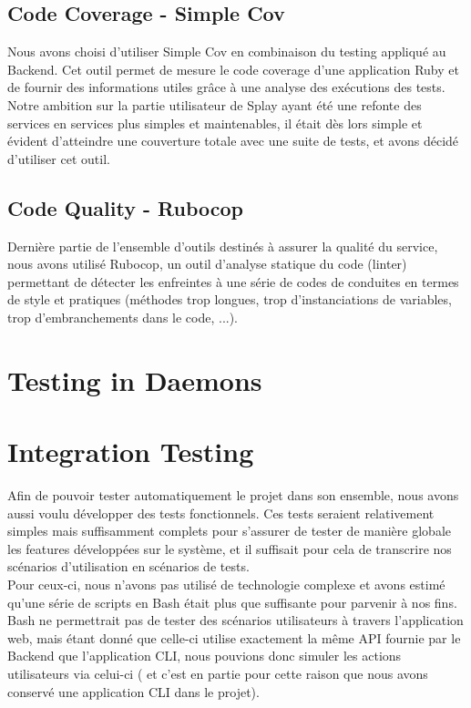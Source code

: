 \documentclass{eplmastersthesis}
\begin{document}
      \subsection{Code Coverage - Simple Cov}

        Nous avons choisi d'utiliser Simple Cov en combinaison du testing appliqué
        au Backend. Cet outil permet de mesure le code coverage d'une application
        Ruby et de fournir des informations utiles grâce à une analyse des
        exécutions des tests.\\

        Notre ambition sur la partie utilisateur de Splay ayant été une refonte
        des services en services plus simples et maintenables, il était dès lors
        simple et évident d'atteindre une couverture totale avec une suite de tests,
        et avons décidé d'utiliser cet outil.

      \subsection{Code Quality - Rubocop}

        Dernière partie de l'ensemble d'outils destinés à assurer la qualité du
        service, nous avons utilisé Rubocop, un outil d'analyse statique du code
        (linter) permettant de détecter les enfreintes à une série de codes
        de conduites en termes de style et pratiques (méthodes trop longues,
        trop d'instanciations de variables, trop d'embranchements dans le code,
        ...).

    \section{Testing in Daemons}


    \section{Integration Testing}

      Afin de pouvoir tester automatiquement le projet dans son ensemble, nous
      avons aussi voulu développer des tests fonctionnels. Ces tests seraient
      relativement simples mais suffisamment complets pour s'assurer de
      tester de manière globale les features développées sur le système, et
      il suffisait pour cela de transcrire nos scénarios d'utilisation en
      scénarios de tests.\\

      Pour ceux-ci, nous n'avons pas utilisé de technologie complexe et avons
      estimé qu'une série de scripts en Bash était plus que suffisante pour
      parvenir à nos fins. Bash ne permettrait pas de tester des scénarios
      utilisateurs à travers l'application web, mais étant donné que celle-ci
      utilise exactement la même API fournie par le Backend que l'application
      CLI, nous pouvions donc simuler les actions utilisateurs via celui-ci (
      et c'est en partie pour cette raison que nous avons conservé une
      application CLI dans le projet).\\
\end{document}
